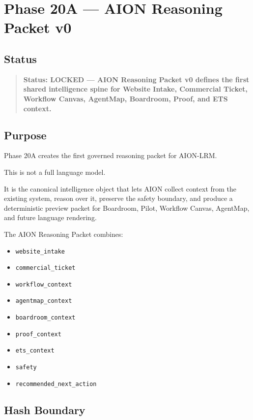\section{Phase 20A --- AION Reasoning Packet v0}
\label{sec:phase20a-aion-reasoning-packet-v0}

\subsection{Status}

\begin{quote}
\textbf{Status: LOCKED --- AION Reasoning Packet v0 defines the first shared intelligence spine for Website Intake, Commercial Ticket, Workflow Canvas, AgentMap, Boardroom, Proof, and ETS context.}
\end{quote}

\subsection{Purpose}

Phase 20A creates the first governed reasoning packet for AION-LRM.

This is not a full language model.

It is the canonical intelligence object that lets AION collect context from the existing system, reason over it, preserve the safety boundary, and produce a deterministic preview packet for Boardroom, Pilot, Workflow Canvas, AgentMap, and future language rendering.

The AION Reasoning Packet combines:

\begin{itemize}
  \item \texttt{website\_intake}
  \item \texttt{commercial\_ticket}
  \item \texttt{workflow\_context}
  \item \texttt{agentmap\_context}
  \item \texttt{boardroom\_context}
  \item \texttt{proof\_context}
  \item \texttt{ets\_context}
  \item \texttt{safety}
  \item \texttt{recommended\_next\_action}
\end{itemize}

\subsection{Hash Boundary}

